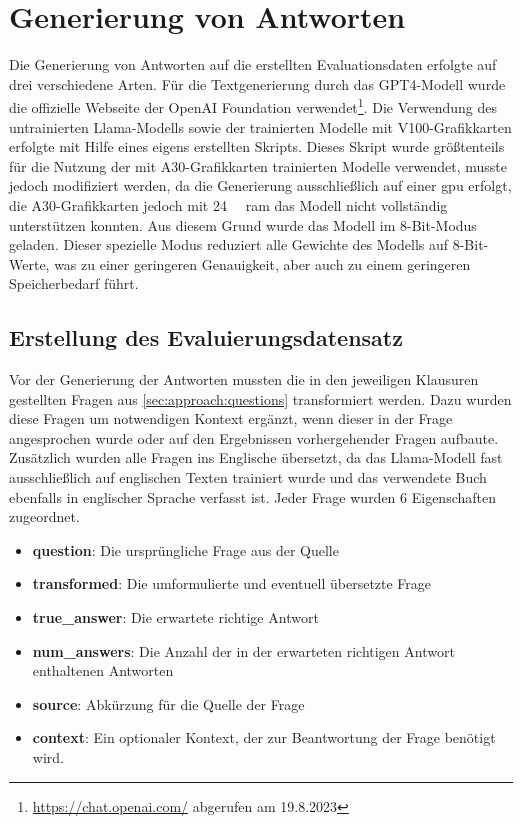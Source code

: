 \section{Generierung von Antworten}\label{sec:generierung}
Die Generierung von Antworten auf die erstellten Evaluationsdaten erfolgte auf drei verschiedene Arten.
Für die Textgenerierung durch das GPT4-Modell wurde die offizielle Webseite der OpenAI Foundation verwendet\footnote{\url{https://chat.openai.com/} abgerufen am 19.8.2023}.
Die Verwendung des untrainierten Llama-Modells sowie der trainierten Modelle mit V100-Grafikkarten erfolgte mit Hilfe eines eigens erstellten Skripts.
Dieses Skript wurde größtenteils für die Nutzung der mit A30-Grafikkarten trainierten Modelle verwendet, musste jedoch modifiziert werden, da die Generierung ausschließlich auf einer \ac{gpu} erfolgt, die A30-Grafikkarten jedoch mit \SI{24}{\giga\byte} \ac{ram} das Modell nicht vollständig unterstützen konnten.
Aus diesem Grund wurde das Modell im 8-Bit-Modus geladen. Dieser spezielle Modus reduziert alle Gewichte des Modells auf 8-Bit-Werte, was zu einer geringeren Genauigkeit, aber auch zu einem geringeren Speicherbedarf führt.\\

\subsection{Erstellung des Evaluierungsdatensatz}\label{subsec:eval-dataset}
Vor der Generierung der Antworten mussten die in den jeweiligen Klausuren gestellten Fragen aus \cref{sec:approach:questions} transformiert werden.
Dazu wurden diese Fragen um notwendigen Kontext ergänzt, wenn dieser in der Frage angesprochen wurde oder auf den Ergebnissen vorhergehender Fragen aufbaute.
Zusätzlich wurden alle Fragen ins Englische übersetzt, da das Llama-Modell fast ausschließlich auf englischen Texten trainiert wurde und das verwendete Buch \citet{bb} ebenfalls in englischer Sprache verfasst ist.
Jeder Frage wurden 6 Eigenschaften zugeordnet.
\begin{itemize}
    \item \textbf{question}: Die ursprüngliche Frage aus der Quelle
    \item \textbf{transformed}: Die umformulierte und eventuell übersetzte Frage
    \item \textbf{true\_answer}: Die erwartete richtige Antwort
    \item \textbf{num\_answers}: Die Anzahl der in der erwarteten richtigen Antwort enthaltenen Antworten
    \item \textbf{source}: Abkürzung für die Quelle der Frage
    \item \textbf{context}: Ein optionaler Kontext, der zur Beantwortung der Frage benötigt wird.
\end{itemize}

